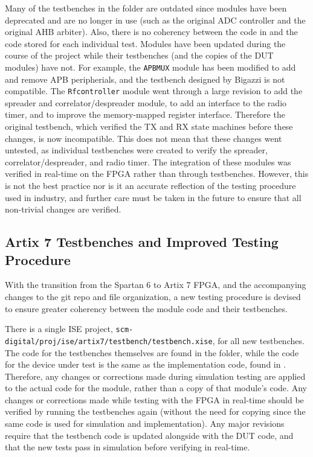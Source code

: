 Many of the testbenches in the  folder are outdated since modules have been deprecated and are no longer in use (such as the original ADC controller and the original AHB arbiter). Also, there is no coherency between the code in  and the code stored for each individual test. Modules have been updated during the course of the project while their testbenches (and the copies of the DUT modules) have not. For example, the \texttt{APBMUX} module has been modified to add and remove APB peripherials, and the testbench designed by Bigazzi is not compatible. The \texttt{Rfcontroller} module went through a large revision to add the spreader and correlator/despreader module, to add an interface to the radio timer, and to improve the memory-mapped register interface. Therefore the original testbench, which verified the TX and RX state machines before these changes, is now incompatible. This does not mean that these changes went untested, as individual testbenches were created to verify the spreader, correlator/despreader, and radio timer. The integration of these modules was verified in real-time on the FPGA rather than through testbenches. However, this is not the best practice nor is it an accurate reflection of the testing procedure used in industry, and further care must be taken in the future to ensure that all non-trivial changes are verified.

\subsection{Artix 7 Testbenches and Improved Testing Procedure}
With the transition from the Spartan 6 to Artix 7 FPGA, and the accompanying changes to the git repo and file organization, a new testing procedure is devised to ensure greater coherency between the module code and their testbenches.

There is a single ISE project, \texttt{scm-digital/proj/ise/artix7/testbench/te\-s\-t\-b\-ench.xise}, for all new testbenches. The code for the testbenches themselves are found in the  folder, while the code for the device under test is the same as the implementation code, found in . Therefore, any changes or corrections made during simulation testing are applied to the actual code for the module, rather than a copy of that module's code. Any changes or corrections made while testing with the FPGA in real-time should be verified by running the testbenches again (without the need for copying since the same code is used for simulation and implementation). Any major revisions require that the testbench code is updated alongside with the DUT code, and that the new tests pass in simulation before verifying in real-time.

